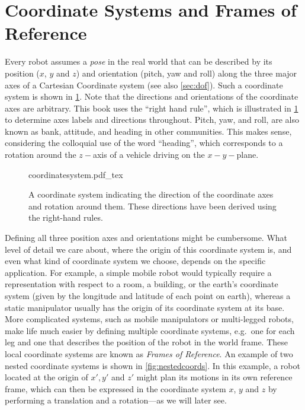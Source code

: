 \section{Coordinate Systems and Frames of Reference}\label{sec:coordsystems}


Every robot assumes a \textsl{pose} in the real world that can be described by its position ($x$, $y$ and $z$) and orientation (pitch, yaw and roll) along the three major axes of a Cartesian Coordinate system (see also \cref{sec:dof}).
Such a coordinate system is shown in \cref{fig:coordinatesystem}. Note that the directions and orientations of the coordinate axes are arbitrary. This book uses the ``right hand rule'', which is illustrated in \cref{fig:coordinatesystem} to determine axes labels and directions throughout.
Pitch, yaw, and roll, are also known as bank, attitude, and heading in other communities. This makes sense, considering the colloquial use of the word ``heading'', which corresponds to a rotation around the $z-$axis of a vehicle driving on the $x-y-$plane.

\begin{figure}
    \centering
    \def\svgwidth{0.8\textwidth}
    {coordinatesystem.pdf_tex}
    \caption{A coordinate system indicating the direction of the coordinate axes and rotation around them. These directions have been derived using the right-hand rules.}
    \label{fig:coordinatesystem}
\end{figure}

Defining all three position axes and orientations might be cumbersome. What level of detail we care about, where the origin of this coordinate system is, and even what kind of coordinate system we choose, depends on the specific application.
For example, a simple mobile robot would typically require a representation with respect to a room, a building, or the earth's coordinate system (given by the longitude and latitude of each point on earth), whereas a static manipulator usually has the origin of its coordinate system at its base.
More complicated systems, such as mobile manipulators or multi-legged robots, make life much easier by defining multiple coordinate systems, e.g.\ one for each leg and one that describes the position of the robot in the world frame. These local coordinate systems are known as \emph{Frames of Reference}.
An example of two nested coordinate systems is shown in \cref{fig:nestedcoords}. In this example, a robot located at the origin of $x',y'$ and $z'$ might plan its motions in its own reference frame, which can then be expressed in the coordinate system $x$, $y$ and $z$ by performing a translation and a rotation---as we will later see.

